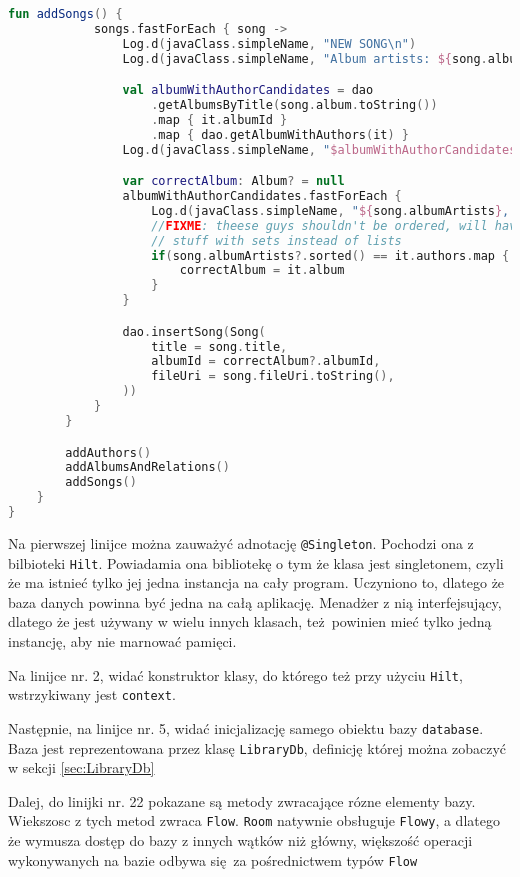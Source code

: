 \begin{lstlisting}[caption=Strukutura klasy \texttt{DatabaseManager}, label={lst:DatabaseManager_struct}, language=kotlin]
        fun addSongs() {
            songs.fastForEach { song ->
                Log.d(javaClass.simpleName, "NEW SONG\n")
                Log.d(javaClass.simpleName, "Album artists: ${song.albumArtists}")

                val albumWithAuthorCandidates = dao
                    .getAlbumsByTitle(song.album.toString())
                    .map { it.albumId }
                    .map { dao.getAlbumWithAuthors(it) }
                Log.d(javaClass.simpleName, "$albumWithAuthorCandidates")

                var correctAlbum: Album? = null
                albumWithAuthorCandidates.fastForEach {
                    Log.d(javaClass.simpleName, "${song.albumArtists}, ${it.authors}")
                    //FIXME: theese guys shouldn't be ordered, will have to refactor a bunch of
                    // stuff with sets instead of lists
                    if(song.albumArtists?.sorted() == it.authors.map { it.name }.sorted()) {
                        correctAlbum = it.album
                    }
                }

                dao.insertSong(Song(
                    title = song.title,
                    albumId = correctAlbum?.albumId,
                    fileUri = song.fileUri.toString(),
                ))
            }
        }

        addAuthors()
        addAlbumsAndRelations()
        addSongs()
    }
}
\end{lstlisting}

Na pierwszej linijce można zauważyć adnotację \texttt{@Singleton}. Pochodzi ona z bilbioteki \texttt{Hilt}\cite{doc_hilt}. Powiadamia ona bibliotekę o tym że klasa jest singletonem, czyli że ma istnieć tylko jej jedna instancja na cały program. Uczyniono to, dlatego że baza danych powinna być jedna na całą aplikację. Menadżer z nią interfejsujący, dlatego że jest używany w wielu innych klasach, też powinien mieć tylko jedną instancję, aby nie marnować pamięci.

Na linijce nr. 2, widać konstruktor klasy, do którego też przy użyciu \texttt{Hilt}, wstrzykiwany jest \texttt{context}.

Następnie, na linijce nr. 5, widać inicjalizację samego obiektu bazy \texttt{database}. Baza jest reprezentowana przez klasę \texttt{LibraryDb}, definicję której można zobaczyć w sekcji \ref{sec:LibraryDb}

Dalej, do linijki nr. 22 pokazane są metody zwracające rózne elementy bazy. Wiekszosc z tych metod zwraca \texttt{Flow}\cite{TODO:}. \texttt{Room} natywnie obsługuje \texttt{Flowy}, a dlatego że wymusza dostęp do bazy z innych wątków niż główny, większość operacji wykonywanych na bazie odbywa się za pośrednictwem typów \texttt{Flow}


